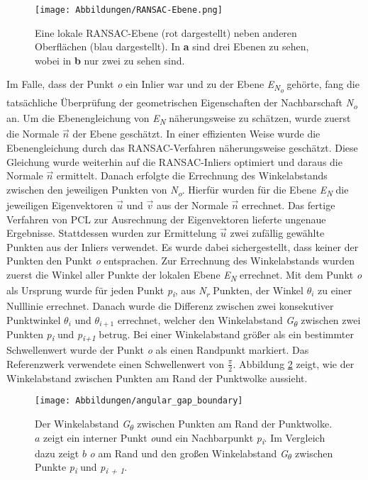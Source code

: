 \begin{figure}[h]
	\texttt{[image: Abbildungen/RANSAC-Ebene.png]}
	\centering
	\caption{Eine lokale RANSAC-Ebene (rot dargestellt) neben anderen Oberflächen (blau dargestellt). In \textbf{a} sind drei Ebenen zu sehen, wobei in \textbf{b} nur zwei zu sehen sind. \autocite{ni_edge_2016}}
	\label{RANSAC-Ebene}
\end{figure} 

Im Falle, dass der Punkt \textit{o} ein Inlier war und zu der Ebene \textit{E\textsubscript{N\textsubscript{o}}} gehörte, fang die tatsächliche Überprüfung der geometrischen Eigenschaften der Nachbarschaft \textit{N\textsubscript{o}} an. Um die Ebenengleichung von \textit{E\textsubscript{N}} näherungsweise zu schätzen, wurde zuerst die Normale \textit{$\vec{n}$} der Ebene geschätzt. In einer effizienten Weise wurde die Ebenengleichung durch das RANSAC-Verfahren näherungsweise geschätzt. Diese Gleichung wurde weiterhin auf die RANSAC-Inliers optimiert und daraus die Normale \textit{$\vec{n}$} ermittelt. Danach erfolgte die Errechnung des Winkelabstands zwischen den jeweiligen Punkten von \textit{N\textsubscript{o}}. Hierfür wurden für die Ebene \textit{E\textsubscript{N}} die jeweiligen Eigenvektoren $\vec{u}$ und $\vec{v}$ aus der Normale $\vec{n}$ errechnet. Das fertige Verfahren von PCL zur Ausrechnung der Eigenvektoren lieferte ungenaue Ergebnisse. Stattdessen wurden zur Ermittelung \textit{$\vec{u}$} zwei zufällig gewählte Punkten aus der Inliers verwendet. Es wurde dabei sichergestellt, dass keiner der Punkten den Punkt \textit{o} entsprachen. Zur Errechnung des Winkelabstands wurden zuerst die Winkel aller Punkte der lokalen Ebene \textit{E\textsubscript{N}} errechnet. Mit dem Punkt \textit{o} als Ursprung wurde für jeden Punkt \textit{p\textsubscript{i}}, aus \textit{N\textsubscript{r}} Punkten, der Winkel \textit{$\theta_i$} zu einer Nulllinie errechnet. Danach wurde die Differenz zwischen zwei konsekutiver Punktwinkel $\theta_i$ und $\theta_{i+1}$ errechnet, welcher den Winkelabstand \textit{G\textsubscript{$\theta$}} zwischen zwei Punkten \textit{p\textsubscript{i}} und \textit{p\textsubscript{i+1}} betrug. Bei einer Winkelabstand größer als ein bestimmter Schwellenwert wurde der Punkt \textit{o} als einen Randpunkt markiert. Das Referenzwerk verwendete einen Schwellenwert von $\frac{\pi}{2}$. Abbildung \ref{edge_boundary} zeigt, wie der Winkelabstand zwischen Punkten am Rand der Punktwolke aussieht.

\begin{figure}[h]
	\texttt{[image: Abbildungen/angular\_gap\_boundary]}
	\centering
	\caption{Der Winkelabstand \textit{G\textsubscript{$\theta$}} zwischen Punkten am Rand der Punktwolke. \textbf{\(a\)} zeigt ein interner Punkt \textit{o}und ein Nachbarpunkt \textit{p\textsubscript{i}}. Im Vergleich dazu zeigt \textbf{\(b\)} \textit{o} am Rand und den großen Winkelabstand \textit{G\textsubscript{$\theta$}} zwischen Punkte \textit{p\textsubscript{i}} und \textit{p\textsubscript{i + 1}}. \autocite{ni_edge_2016}}
	\label{edge_boundary}
\end{figure}

